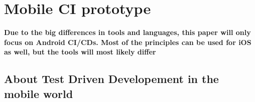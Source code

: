 \section{Mobile CI prototype}

\begin{mdframed}[style=InfoBox,align=center]
	\textbf{Due to the big differences in tools and languages, this paper will only focus on Android CI/CDs. Most of the principles can be used for iOS as well, but the tools will most likely differ}
\end{mdframed}

\subsection{About Test Driven Developement in the mobile world}